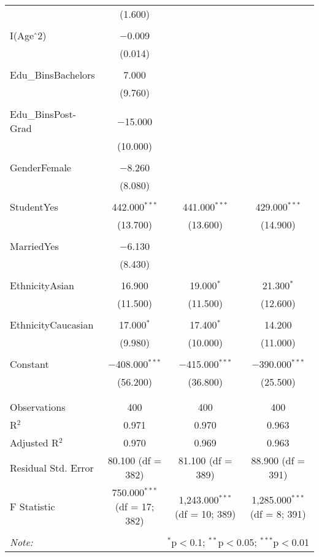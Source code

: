 \documentclass[11pt]{article}
\begin{document}
\begin{table}[!htbp]
\begin{tabular}{@{\extracolsep{5pt}}lccc}
  & (1.600) &  &  \\ 
  & & & \\ 
 I(Age$\hat{\mkern6mu}$2) & $-$0.009 &  &  \\ 
  & (0.014) &  &  \\ 
  & & & \\ 
 Edu\_BinsBachelors & 7.000 &  &  \\ 
  & (9.760) &  &  \\ 
  & & & \\ 
 Edu\_BinsPost-Grad & $-$15.000 &  &  \\ 
  & (10.000) &  &  \\ 
  & & & \\ 
 GenderFemale & $-$8.260 &  &  \\ 
  & (8.080) &  &  \\ 
  & & & \\ 
 StudentYes & 442.000$^{***}$ & 441.000$^{***}$ & 429.000$^{***}$ \\ 
  & (13.700) & (13.600) & (14.900) \\ 
  & & & \\ 
 MarriedYes & $-$6.130 &  &  \\ 
  & (8.430) &  &  \\ 
  & & & \\ 
 EthnicityAsian & 16.900 & 19.000$^{*}$ & 21.300$^{*}$ \\ 
  & (11.500) & (11.500) & (12.600) \\ 
  & & & \\ 
 EthnicityCaucasian & 17.000$^{*}$ & 17.400$^{*}$ & 14.200 \\ 
  & (9.980) & (10.000) & (11.000) \\ 
  & & & \\ 
 Constant & $-$408.000$^{***}$ & $-$415.000$^{***}$ & $-$390.000$^{***}$ \\ 
  & (56.200) & (36.800) & (25.500) \\ 
  & & & \\ 
\hline \\[-1.8ex] 
Observations & 400 & 400 & 400 \\ 
R$^{2}$ & 0.971 & 0.970 & 0.963 \\ 
Adjusted R$^{2}$ & 0.970 & 0.969 & 0.963 \\ 
Residual Std. Error & 80.100 (df = 382) & 81.100 (df = 389) & 88.900 (df = 391) \\ 
F Statistic & 750.000$^{***}$ (df = 17; 382) & 1,243.000$^{***}$ (df = 10; 389) & 1,285.000$^{***}$ (df = 8; 391) \\ 
\hline 
\hline \\[-1.8ex] 
\textit{Note:}  & \multicolumn{3}{r}{$^{*}$p$<$0.1; $^{**}$p$<$0.05; $^{***}$p$<$0.01} \\ 
\end{tabular} 
\end{table} 
\end{document}
